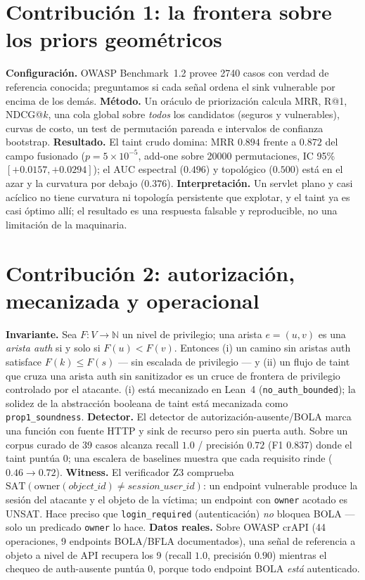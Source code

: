 \documentclass[11pt]{article}
\newcommand{\N}{\mathbb{N}}
\begin{document}
\section{Contribución 1: la frontera sobre los priors geométricos}
\textbf{Configuración.} OWASP Benchmark~1.2 provee 2740 casos con verdad de
referencia conocida; preguntamos si cada señal ordena el sink vulnerable por
encima de los demás. \textbf{Método.} Un oráculo de priorización calcula MRR, R@1,
NDCG@$k$, una cola global sobre \emph{todos} los candidatos (seguros y
vulnerables), curvas de costo, un test de permutación pareada e intervalos de
confianza bootstrap. \textbf{Resultado.} El taint crudo domina: MRR $0.894$ frente
a $0.872$ del campo fusionado ($p=5\times10^{-5}$, add-one sobre 20000
permutaciones, IC 95\% $[+0.0157,+0.0294]$); el AUC espectral ($0.496$) y
topológico ($0.500$) está en el azar y la curvatura por debajo ($0.376$).
\textbf{Interpretación.} Un servlet plano y casi acíclico no tiene curvatura ni
topología persistente que explotar, y el taint ya es casi óptimo allí; el
resultado es una respuesta falsable y reproducible, no una limitación de la
maquinaria.

\section{Contribución 2: autorización, mecanizada y operacional}
\textbf{Invariante.} Sea $F:V\to\N$ un nivel de privilegio; una arista $e=(u,v)$
es una \emph{arista auth} si y solo si $F(u)<F(v)$. Entonces (i) un camino sin
aristas auth satisface $F(k)\le F(s)$ --- sin escalada de privilegio --- y (ii) un
flujo de taint que cruza una arista auth sin sanitizador es un cruce de frontera
de privilegio controlado por el atacante. (i) está mecanizado en Lean~4
(\texttt{no\_auth\_bounded}); la solidez de la abstracción booleana de taint está
mecanizada como \texttt{prop1\_soundness}. \textbf{Detector.} El detector de
autorización-ausente/BOLA marca una función con fuente HTTP y sink de recurso pero
sin puerta auth. Sobre un corpus curado de 39 casos alcanza recall $1.0$ /
precisión $0.72$ (F1 $0.837$) donde el taint puntúa $0$; una escalera de baselines
muestra que cada requisito rinde ($0.46\to0.72$). \textbf{Witness.} El verificador
Z3 comprueba $\mathrm{SAT}(\mathrm{owner}(object\_id)\neq session\_user\_id)$: un
endpoint vulnerable produce la sesión del atacante y el objeto de la víctima; un
endpoint con \texttt{owner} acotado es UNSAT. Hace preciso que
\texttt{login\_required} (autenticación) \emph{no} bloquea BOLA --- solo un
predicado \texttt{owner} lo hace. \textbf{Datos reales.} Sobre OWASP crAPI (44
operaciones, 9 endpoints BOLA/BFLA documentados), una señal de referencia a
objeto a nivel de API recupera los 9 (recall $1.0$, precisión $0.90$) mientras el
chequeo de auth-ausente puntúa $0$, porque todo endpoint BOLA \emph{está}
autenticado.
\end{document}

